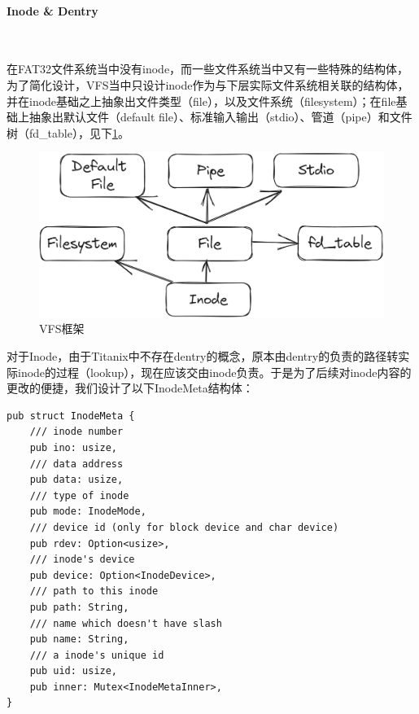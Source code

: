 \paragraph{Inode \& Dentry}~{}

在FAT32文件系统当中没有inode，而一些文件系统当中又有一些特殊的结构体，为了简化设计，VFS当中只设计inode作为与下层实际文件系统相关联的结构体，并在inode基础之上抽象出文件类型（file），以及文件系统（filesystem）；在file基础上抽象出默认文件（default file）、标准输入输出（stdio）、管道（pipe）和文件树（fd\_table），见下\cref{pic:vfs_layout}。

\begin{figure}[hbt]
    \centering
    \includegraphics[width=.8\linewidth]{figure/vfs_layout.png}
    \caption{VFS框架}
    \label{pic:vfs_layout}
\end{figure}

对于Inode，由于Titanix中不存在dentry的概念，原本由dentry的负责的路径转实际inode的过程（lookup），现在应该交由inode负责。于是为了后续对inode内容的更改的便捷，我们设计了以下InodeMeta结构体：




\begin{tcolorbox}[
title=\textbf{os/src/fs/inode.rs},
listing only,
breakable
]
\begin{verbatim}
pub struct InodeMeta {
    /// inode number
    pub ino: usize,
    /// data address
    pub data: usize,
    /// type of inode
    pub mode: InodeMode,
    /// device id (only for block device and char device)
    pub rdev: Option<usize>,
    /// inode's device
    pub device: Option<InodeDevice>,
    /// path to this inode
    pub path: String,
    /// name which doesn't have slash
    pub name: String,
    /// a inode's unique id
    pub uid: usize,
    pub inner: Mutex<InodeMetaInner>,
}
\end{verbatim}
\end{tcolorbox}

